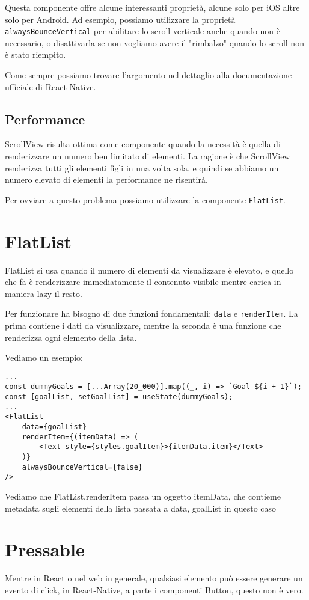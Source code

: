 \documentclass[12pt]{article}
\begin{document}
Questa componente offre alcune interessanti proprietà, alcune solo per iOS altre 
solo per Android. Ad esempio, possiamo utilizzare la proprietà \texttt{alwaysBounceVertical}
per abilitare lo scroll verticale anche quando non è necessario, o disattivarla se non
vogliamo avere il "rimbalzo" quando lo scroll non è stato riempito.

Come sempre possiamo trovare l'argomento nel dettaglio alla
\href{https://reactnative.dev/docs/scrollview#alwaysbouncevertical}{documentazione ufficiale di React-Native}.

\subsection{Performance}
ScrollView risulta ottima come componente quando la necessità
è quella di renderizzare un numero ben limitato di elementi.
La ragione è che ScrollView renderizza tutti gli elementi figli
in una volta sola, e quindi se abbiamo un numero elevato di elementi
la performance ne risentirà.

Per ovviare a questo problema possiamo utilizzare la componente \texttt{FlatList}.

\section{FlatList}
FlatList si usa quando il numero di elementi da visualizzare è elevato, 
e quello che fa è renderizzare immediatamente il contenuto visibile mentre carica in maniera lazy
il resto. 

Per funzionare ha bisogno di due funzioni fondamentali: \texttt{data} e \texttt{renderItem}.
La prima contiene i dati da visualizzare, mentre la seconda è una funzione che renderizza
ogni elemento della lista.

Vediamo un esempio: 
\begin{verbatim}
...
const dummyGoals = [...Array(20_000)].map((_, i) => `Goal ${i + 1}`);
const [goalList, setGoalList] = useState(dummyGoals);
...
<FlatList
    data={goalList}
    renderItem={(itemData) => (
        <Text style={styles.goalItem}>{itemData.item}</Text>
    )}
    alwaysBounceVertical={false}
/>
\end{verbatim}
Vediamo che FlatList.renderItem passa un oggetto itemData, che contieme metadata
sugli elementi della lista passata a data, goalList in questo caso




\section{Pressable}
Mentre in React o nel web in generale, qualsiasi 
elemento può essere generare un evento di click, in React-Native,
a parte i componenti Button, questo non è vero.
\end{document}
